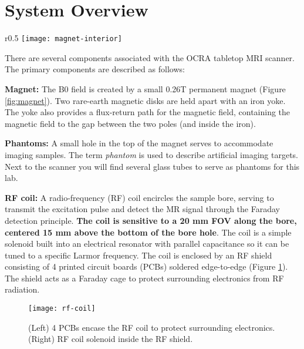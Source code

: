 \newpage
\section{System Overview}

\begin{wrapfigure}{r}{0.5\textwidth}%
    \centering
    \vspace{-2mm}
    \texttt{[image: magnet-interior]}
    \caption{\label{fig:magnet} Interior view of the magnet box. Two magnetic disks are held apart with an iron yoke.}
    \vspace{-10mm}
\end{wrapfigure}

There are several components associated with the OCRA tabletop MRI scanner. The primary components are described as follows: 
\vspace{5mm} 

\noindent\textbf{Magnet:} The B0 field is created by a small 0.26T permanent magnet (Figure \ref{fig:magnet}). Two rare-earth magnetic disks are held apart with an iron yoke. The yoke also provides a flux-return path for the magnetic field, containing the magnetic field to the gap between the two poles (and inside the iron). 
\vspace{5mm} 

\noindent\textbf{Phantoms:} A small hole in the top of the magnet serves to accommodate imaging samples. The term \emph{phantom} is used to describe artificial imaging targets.  Next to the scanner you will find several glass tubes to serve as phantoms for this lab.
\vspace{5mm} 

\noindent\textbf{RF coil:}
A radio-frequency (RF) coil encircles the sample bore, serving to transmit the excitation pulse and detect the MR signal through the Faraday detection principle. \textbf{The coil is sensitive to a 20 mm FOV along the bore, centered 15 mm above the bottom of the bore hole}. The coil is a simple solenoid built into an electrical resonator with parallel capacitance so it can be tuned to a specific Larmor frequency. The coil is enclosed by an RF shield consisting of 4 printed circuit boards (PCBs) soldered edge-to-edge (Figure \ref{fig:rf-coil}). The shield acts as a Faraday cage to protect surrounding electronics from RF radiation.

 \begin{figure}[h]
    \centering
    \texttt{[image: rf-coil]}
    \captionsetup{width=.9\textwidth}
    \caption{\label{fig:rf-coil} (Left) 4 PCBs encase the RF coil to protect surrounding electronics. (Right) RF coil solenoid inside the RF shield.}
    \vspace{-5mm}
\end{figure}


